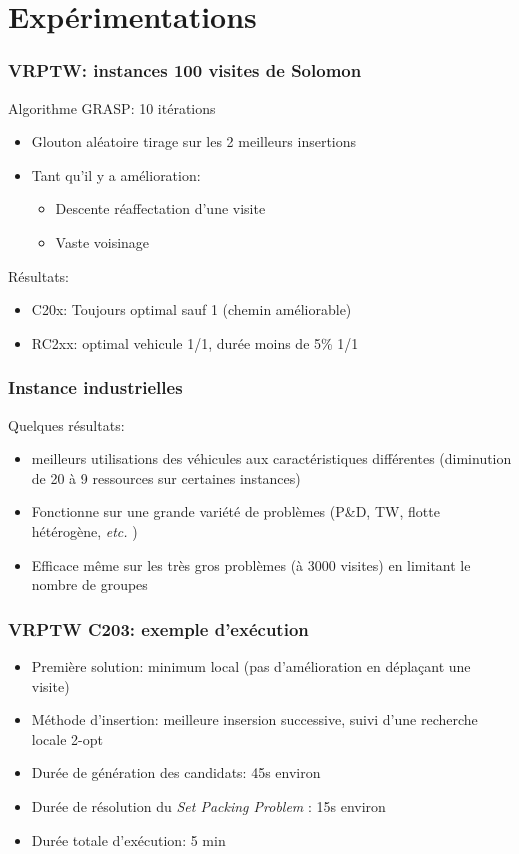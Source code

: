 \documentclass[table]{beamer}
\newcommand*{\foreign}[2][english]{%
    \emph{\foreignlanguage{#1}{#2}}%
}
\begin{document}
\section{Expérimentations}

\begin{frame}
  \frametitle{VRPTW: instances 100 visites de Solomon}

  Algorithme GRASP: 10 itérations
  \begin{itemize}
  \item Glouton aléatoire tirage sur les 2 meilleurs insertions
  \item Tant qu'il y a amélioration:
    \begin{itemize}
    \item Descente réaffectation d'une visite
    \item Vaste voisinage
    \end{itemize}
  \end{itemize}

  Résultats:
  \begin{itemize}
  \item C20x: Toujours optimal sauf 1 (chemin améliorable)
  \item RC2xx: optimal vehicule 1/1, durée moins de 5\% 1/1
  \end{itemize}
\end{frame}

\begin{frame}
  \frametitle{Instance industrielles}

  Quelques résultats:
  \begin{itemize}
  \item meilleurs utilisations des véhicules aux caractéristiques
    différentes (diminution de 20 à 9 ressources sur certaines
    instances)
  \item Fonctionne sur une grande variété de problèmes (P\&D, TW,
    flotte hétérogène, \foreign{etc.})
  \item Efficace même sur les très gros problèmes (à 3000 visites) en
    limitant le nombre de groupes
  \end{itemize}
\end{frame}

\begin{frame}
  \frametitle{VRPTW C203: exemple d'exécution}

  \begin{itemize}
  \item Première solution: minimum local (pas d'amélioration en
    déplaçant une visite)
  \item Méthode d'insertion: meilleure insersion successive, suivi
    d'une recherche locale 2-opt
  \item Durée de génération des candidats: 45s environ
  \item Durée de résolution du \foreign{Set Packing Problem}: 15s environ
  \item Durée totale d'exécution: 5 min
  \end{itemize}
\end{frame}
\end{document}
